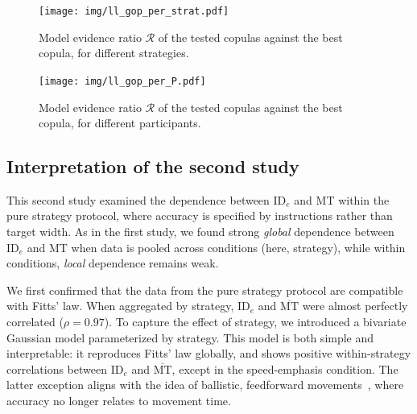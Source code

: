 \documentclass[acmlarge, manuscript,review]{acmart}
\newcommand{\mmt}{\ensuremath{\overline{\mt}}\xspace}
\newcommand{\mt}{\ensuremath{{\text{MT}}}\xspace}
\newcommand{\ide}{\ensuremath{{\text{ID}_e}}\xspace}
\begin{document}
\begin{figure}[htbp]
	\centering
		\texttt{[image: img/ll\_gop\_per\_strat.pdf]}
	\caption{Model evidence ratio $\mathcal{R}$ of the tested copulas against the best copula, for different strategies.}
	\label{fig:r_cop_gop_s}
\end{figure}




\begin{figure}[htbp]
	\centering
		\texttt{[image: img/ll\_gop\_per\_P.pdf]}
	\caption{Model evidence ratio $\mathcal{R}$ of the tested copulas against the best copula, for different participants.}
	\label{fig:ll_cop_gop_p}
\end{figure}


\subsection{Interpretation of the second study}
This second study examined the dependence between \ide and MT within the pure strategy protocol, where accuracy is specified by instructions rather than target width. 
As in the first study, we found strong \textit{global} dependence between \ide and MT when data is pooled across conditions (here, strategy), while within conditions, \textit{local} dependence remains weak.



We first confirmed that the data from the pure strategy protocol are compatible with Fitts' law. When aggregated by strategy, \ide and \mmt were almost perfectly correlated ($\rho = 0.97$). To capture the effect of strategy, we introduced a bivariate Gaussian model parameterized by strategy. This model is both simple and interpretable: it reproduces Fitts' law globally, and shows positive within-strategy correlations between \ide and \mmt, except in the speed-emphasis condition. The latter exception aligns with the idea of ballistic, feedforward movements~\cite{gan1988,crossman1957}, where accuracy no longer relates to movement time.
\end{document}
